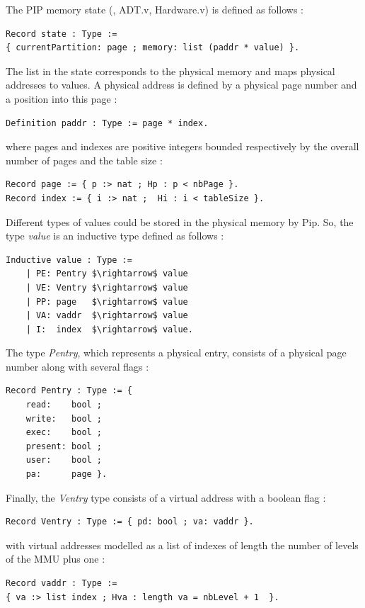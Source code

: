 \noindent The PIP memory state \cite{PIPdraft} (\cite{PIP}, ADT.v, Hardware.v) is defined as follows :
\begin{lstlisting}[linewidth=1.02\linewidth,caption = {PIP state definition},label={PIPstate}] 
Record state : Type := 
{ currentPartition: page ; memory: list (paddr * value) }.
\end{lstlisting}
The list in the state corresponds to the physical memory and maps physical addresses to values. A physical address is defined by a physical page number and a position into this page :
\begin{lstlisting}[caption = {paddr type definition},xleftmargin=.15\textwidth,xrightmargin=.15\textwidth] 
Definition paddr : Type := page * index.
\end{lstlisting}
where pages and indexes are positive integers bounded respectively by the overall number of pages and the table size :
\begin{lstlisting}[caption = {page \& index type definitions},xleftmargin=.05\textwidth,xrightmargin=.05\textwidth]
Record page := { p :> nat ; Hp : p < nbPage }. 
Record index := { i :> nat ;  Hi : i < tableSize }.
\end{lstlisting}
Different types of values could be stored in the physical memory by Pip. So, the type \textit{value} is an inductive type defined as follows :
\begin{lstlisting}[caption = {value type definition}, mathescape=true,xleftmargin=.23\textwidth,
xrightmargin=.23\textwidth]
Inductive value : Type :=
	| PE: Pentry $\rightarrow$ value
	| VE: Ventry $\rightarrow$ value
	| PP: page   $\rightarrow$ value
	| VA: vaddr  $\rightarrow$ value
	| I:  index  $\rightarrow$ value.
\end{lstlisting}
The type \textit{Pentry}, which represents a physical entry, consists of a physical page number along with several flags :
\begin{lstlisting}[caption = {Pentry type definition},xleftmargin=.27\textwidth,
xrightmargin=.27\textwidth]
Record Pentry : Type := {
  	read:    bool ;
   	write:   bool ;
   	exec:    bool ;
   	present: bool ;
   	user:    bool ;
   	pa:      page }.
\end{lstlisting}
Finally, the \textit{Ventry} type consists of a virtual address with a boolean flag :
\begin{lstlisting}[caption = {Ventry type definition},xleftmargin=.06\textwidth,xrightmargin=.06\textwidth]
Record Ventry : Type := { pd: bool ; va: vaddr }.
\end{lstlisting}
with virtual addresses modelled as a list of indexes of length the number of levels of the MMU plus one :
\begin{lstlisting}[caption = {vaddr type definition},xleftmargin=.02\textwidth,xrightmargin=.02\textwidth]
Record vaddr : Type := 
{ va :> list index ; Hva : length va = nbLevel + 1  }.
\end{lstlisting}

